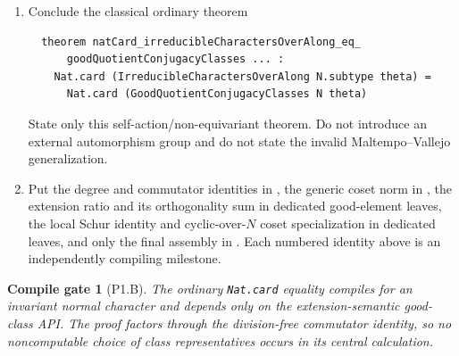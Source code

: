 \documentclass[11pt]{article}
\newtheorem{gate}{Compile gate}
\begin{document}
\begin{enumerate}[label=\textbf{P1.B\arabic*.},leftmargin=*]
  \item Conclude the classical ordinary theorem
  \begin{lstlisting}
  theorem natCard_irreducibleCharactersOverAlong_eq_
      goodQuotientConjugacyClasses ... :
    Nat.card (IrreducibleCharactersOverAlong N.subtype theta) =
      Nat.card (GoodQuotientConjugacyClasses N theta)
  \end{lstlisting}
  State only this self-action/non-equivariant theorem.  Do not
  introduce an external automorphism group and do not state the invalid
  Maltempo--Vallejo generalization.
  \item Put the degree and commutator identities in
  , the generic
  coset norm in
  , the extension
  ratio and its orthogonality sum in dedicated good-element leaves, the
  local Schur identity and cyclic-over-\(N\) coset specialization in
  dedicated leaves, and only the final assembly in
  .  Each
  numbered identity above is an independently compiling milestone.
\end{enumerate}

\begin{gate}[P1.B]
The ordinary \texttt{Nat.card} equality compiles for an invariant normal
character and depends only on the extension-semantic good-class API.  The
proof factors through the division-free commutator identity, so no
noncomputable choice of class representatives occurs in its central
calculation.
\end{gate}
\end{document}
